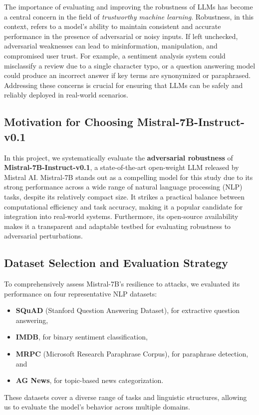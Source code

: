 \documentclass[conference]{IEEEtran}
\begin{document}
The importance of evaluating and improving the robustness of LLMs has become a central concern in the field of \textit{trustworthy machine learning}. Robustness, in this context, refers to a model's ability to maintain consistent and accurate performance in the presence of adversarial or noisy inputs. If left unchecked, adversarial weaknesses can lead to misinformation, manipulation, and compromised user trust. For example, a sentiment analysis system could misclassify a review due to a single character typo, or a question answering model could produce an incorrect answer if key terms are synonymized or paraphrased. Addressing these concerns is crucial for ensuring that LLMs can be safely and reliably deployed in real-world scenarios.

\subsection{ Motivation for Choosing Mistral-7B-Instruct-v0.1}

In this project, we systematically evaluate the \textbf{adversarial robustness} of \textbf{Mistral-7B-Instruct-v0.1}, a state-of-the-art open-weight LLM released by Mistral AI. Mistral-7B stands out as a compelling model for this study due to its strong performance across a wide range of natural language processing (NLP) tasks, despite its relatively compact size. It strikes a practical balance between computational efficiency and task accuracy, making it a popular candidate for integration into real-world systems. Furthermore, its open-source availability makes it a transparent and adaptable testbed for evaluating robustness to adversarial perturbations.

\subsection{Dataset Selection and Evaluation Strategy}

To comprehensively assess Mistral-7B's resilience to attacks, we evaluated its performance on four representative NLP datasets:
\begin{itemize}
    \item \textbf{SQuAD} (Stanford Question Answering Dataset), for extractive question answering,
    \item \textbf{IMDB}, for binary sentiment classification,
    \item \textbf{MRPC} (Microsoft Research Paraphrase Corpus), for paraphrase detection, and
    \item \textbf{AG News}, for topic-based news categorization.
\end{itemize}
These datasets cover a diverse range of tasks and linguistic structures, allowing us to evaluate the model's behavior across multiple domains.
\end{document}
